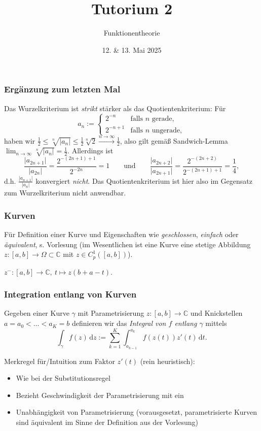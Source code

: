 \documentclass[10pt]{beamer}
\author[\url{https://fdf-uni.github.io/ft}]{}
\title{Tutorium 2}
\subtitle{\texorpdfstring{Funktionentheorie\vspace*{-1.5cm}}{Funktionentheorie}}
\date{12. \& 13. Mai 2025}
\begin{document}
\begin{frame}
	\titlepage
\end{frame}
\begin{frame}
	\frametitle{Ergänzung zum letzten Mal}
	\pause
	Das Wurzelkriterium ist \emph{strikt} stärker als das Quotientenkriterium: Für
	\[
		a_n := \begin{cases} 2^{-n} & \text{falls } n \text{ gerade}, \\ 2^{-n + 1} & \text{falls } n \text{ ungerade}, \end{cases}
	\]
	\pause
	haben wir $\frac{1}{2} \le \sqrt[n]{\lvert a_n \rvert} \le \frac{1}{2} \sqrt[n]{2} \overset{n \to \infty}{\longrightarrow} \frac{1}{2}$, also gilt gemäß \glqq Sandwich-Lemma\grqq{} $\lim_{n \to \infty} \sqrt[n]{\lvert a_n \rvert} = \frac{1}{2}$.
	\pause
	Allerdings ist
	\[
		\frac{\lvert a_{2n + 1} \rvert}{\lvert a_{2n} \rvert} = \frac{2^{-(2n + 1) + 1}}{2^{- 2 n}} = 1 \qquad \text{und} \qquad \frac{\lvert a_{2n + 2} \rvert}{\lvert a_{2n + 1} \rvert} = \frac{2^{-(2n + 2)}}{2^{-(2n + 1) + 1}} = \frac{1}{4},
	\]
	d.h. $\frac{\lvert a_{n + 1} \rvert}{\lvert a_n \rvert}$ konvergiert \emph{nicht}.
	Das Quotientenkriterium ist hier also im Gegensatz zum Wurzelkriterium nicht anwendbar.
\end{frame}
\begin{frame}
	\frametitle{Kurven}
	\pause
	Für Definition einer Kurve und Eigenschaften wie \emph{geschlossen}, \emph{einfach} oder \emph{äquivalent}, s. Vorlesung (im Wesentlichen ist eine Kurve eine stetige Abbildung $z \colon [a, b] \to \Omega \subset \mathbb{C}$ mit $z \in C_p^1([a, b])$).
	\pause
	\begin{definition}
		$z^{-} \colon [a, b] \to \mathbb{C}, \ t \mapsto z(b + a - t)$.
	\end{definition}
\end{frame}
\begin{frame}
	\frametitle{Integration entlang von Kurven}
	\begin{definition}[Kurvenintegral]
		Gegeben einer Kurve $\gamma$ mit Parametrisierung $z \colon [a, b] \to \mathbb{C}$ und \glqq{}Knickstellen\grqq{} $a = a_0 < \ldots < a_K = b$ definieren wir das \emph{Integral von $f$ entlang $\gamma$} mittels
		\[
			\int_{\gamma} f(z) \,\mathrm{d}z := \sum_{k=1}^{K} \int_{a_{k-1}}^{a_k} f(z(t)) z'(t) \,\mathrm{d}t.
		\]
	\end{definition}
	\pause
	Merkregel für/Intuition zum Faktor $z'(t)$ (rein heuristisch):
	\pause
	\begin{itemize}
		\item \glqq{}Wie bei der Substitutionsregel\grqq{}
		      \pause
		\item Bezieht \glqq{}Geschwindigkeit\grqq{} der Parametrisierung mit ein
		      \pause
		\item Unabhängigkeit von Parametrisierung (vorausgesetzt, parametrisierte Kurven sind äquivalent im Sinne der Definition aus der Vorlesung)
	\end{itemize}
\end{frame}
\end{document}

